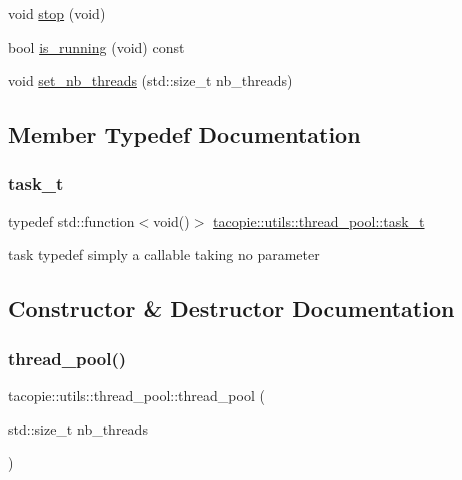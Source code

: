 \begin{DoxyCompactItemize}
\item 
void \hyperlink{classtacopie_1_1utils_1_1thread__pool_a8874d7040d12fbe446519bc9f2bcff37}{stop} (void)
\item 
bool \hyperlink{classtacopie_1_1utils_1_1thread__pool_a77a647a75be188a5c5f83b922c061107}{is\+\_\+running} (void) const
\item 
void \hyperlink{classtacopie_1_1utils_1_1thread__pool_a7c7ae922cedff8fa323828ebb6dea829}{set\+\_\+nb\+\_\+threads} (std\+::size\+\_\+t nb\+\_\+threads)
\end{DoxyCompactItemize}


\subsection{Member Typedef Documentation}
\mbox{\label{classtacopie_1_1utils_1_1thread__pool_a8ae8886fdeaa8e5c0abad12626a47296}} 
\subsubsection{\texorpdfstring{task\+\_\+t}{task\_t}}
{\footnotesize\ttfamily typedef std\+::function$<$void()$>$ \hyperlink{classtacopie_1_1utils_1_1thread__pool_a8ae8886fdeaa8e5c0abad12626a47296}{tacopie\+::utils\+::thread\+\_\+pool\+::task\+\_\+t}}

task typedef simply a callable taking no parameter 

\subsection{Constructor \& Destructor Documentation}
\mbox{\label{classtacopie_1_1utils_1_1thread__pool_aa0068f000b8ecb21b2b0a0c50f77877c}} 
\subsubsection{\texorpdfstring{thread\+\_\+pool()}{thread\_pool()}}
{\footnotesize\ttfamily tacopie\+::utils\+::thread\+\_\+pool\+::thread\+\_\+pool (\begin{DoxyParamCaption}\item[{std\+::size\+\_\+t}]{nb\+\_\+threads }\end{DoxyParamCaption})\hspace{0.3cm}{\ttfamily [explicit]}}

